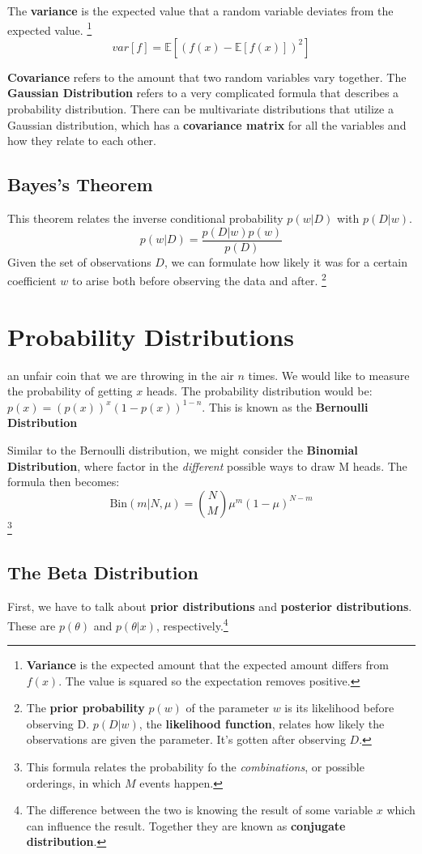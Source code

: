 \documentclass{tufte-handout}
\begin{document}
		The \textbf{variance} is the expected value that a random variable deviates from the 
		expected value. \footnote{\textbf{Variance} is the expected amount that the 
		expected amount differs from $f(x)$. 
		The value is squared so the expectation removes positive.}
		\[ var[f] = \mathbb{E}[(f(x) - \mathbb{E}[f(x)])^{2}]\]

		\textbf{Covariance} refers to the amount that two random variables vary together. The 
		\textbf{Gaussian Distribution} refers to a very complicated formula that describes a
		probability distribution.  There can be multivariate distributions that utilize a 
		Gaussian distribution, which has a \textbf{covariance matrix} for all the variables and
		how they relate to each other. 

	\subsection{Bayes's Theorem}
		This theorem relates the inverse conditional probability $p(w|D)$ with $p(D|w)$. 
		\[ p(w|D) = \frac{p(D|w)p(w)}{p(D)}\]
		Given the set of observations $D$, we can formulate how likely it was for a certain 
		coefficient $w$ to arise both before observing the data and after. \footnote{The 
		\textbf{prior probability} $p(w)$ of the parameter $w$ is its likelihood 
		before observing D. $p(D|w)$, the \textbf{likelihood function}, relates how likely
		the observations are given the parameter. It's gotten after observing $D$.} 
\section{Probability Distributions}
	 an unfair coin that we are throwing in the air $n$ times. We would like
	to measure the probability of getting $x$ heads. The probability distribution would be:
	$p(x)=(p(x))^{x}(1-p(x))^{1-n}$. This is known as the \textbf{Bernoulli Distribution}

	Similar to the Bernoulli distribution, we might consider the \textbf{Binomial Distribution},
	where factor in the \textit{different} possible ways to draw M heads. The formula then becomes:
	\[ \textrm{Bin}(m|N,\mu) = {N\choose M}\mu^{m}(1-\mu)^{N-m}\]\footnote{This formula relates the 
	probability fo the \textit{combinations}, or possible orderings, in which $M$ events happen.}

	\subsection{The Beta Distribution}
	First, we have to talk about \textbf{prior distributions} and \textbf{posterior distributions}.
	These are $p(\theta)$ and $p(\theta|x)$, respectively.\footnote{The difference between the two is
	knowing the result of some variable $x$ which can influence the result. Together they are known as
	\textbf{conjugate distribution}.} 
\end{document}
